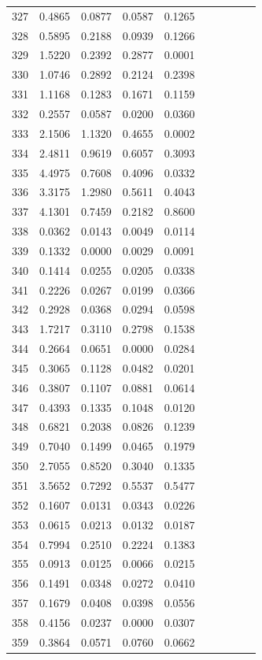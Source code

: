 \begin{table}
\begin{tabular}{cccccccccc}
327& 0.4865& 0.0877& 0.0587& 0.1265\\ 
328& 0.5895& 0.2188& 0.0939& 0.1266\\ 
329& 1.5220& 0.2392& 0.2877& 0.0001\\ 
330& 1.0746& 0.2892& 0.2124& 0.2398\\ 
331& 1.1168& 0.1283& 0.1671& 0.1159\\ 
332& 0.2557& 0.0587& 0.0200& 0.0360\\ 
333& 2.1506& 1.1320& 0.4655& 0.0002\\ 
334& 2.4811& 0.9619& 0.6057& 0.3093\\ 
335& 4.4975& 0.7608& 0.4096& 0.0332\\ 
336& 3.3175& 1.2980& 0.5611& 0.4043\\ 
337& 4.1301& 0.7459& 0.2182& 0.8600\\ 
338& 0.0362& 0.0143& 0.0049& 0.0114\\ 
339& 0.1332& 0.0000& 0.0029& 0.0091\\ 
340& 0.1414& 0.0255& 0.0205& 0.0338\\ 
341& 0.2226& 0.0267& 0.0199& 0.0366\\ 
342& 0.2928& 0.0368& 0.0294& 0.0598\\ 
343& 1.7217& 0.3110& 0.2798& 0.1538\\ 
344& 0.2664& 0.0651& 0.0000& 0.0284\\ 
345& 0.3065& 0.1128& 0.0482& 0.0201\\ 
346& 0.3807& 0.1107& 0.0881& 0.0614\\ 
347& 0.4393& 0.1335& 0.1048& 0.0120\\ 
348& 0.6821& 0.2038& 0.0826& 0.1239\\ 
349& 0.7040& 0.1499& 0.0465& 0.1979\\ 
350& 2.7055& 0.8520& 0.3040& 0.1335\\ 
351& 3.5652& 0.7292& 0.5537& 0.5477\\ 
352& 0.1607& 0.0131& 0.0343& 0.0226\\ 
353& 0.0615& 0.0213& 0.0132& 0.0187\\ 
354& 0.7994& 0.2510& 0.2224& 0.1383\\ 
355& 0.0913& 0.0125& 0.0066& 0.0215\\ 
356& 0.1491& 0.0348& 0.0272& 0.0410\\ 
357& 0.1679& 0.0408& 0.0398& 0.0556\\ 
358& 0.4156& 0.0237& 0.0000& 0.0307\\ 
359& 0.3864& 0.0571& 0.0760& 0.0662\\ 

\end{tabular}
\end{table}
